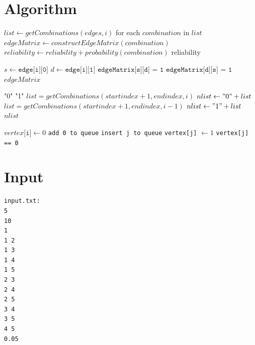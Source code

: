 \documentclass[11pt]{article}
\begin{document}
 \section{Algorithm}
\begin{algorithm}
\label{euclid}
\begin{algorithmic}[1]
\State $list \gets getCombinations(edges, i)$
\State for each $combination$ in $list$
\State $edgeMatrix \gets constructEdgeMatrix(combination)$
\State $reliability \gets reliability + probability(combination)$
\EndIf
\EndFor
\Return reliability
\EndProcedure
\end{algorithmic}
\begin{algorithmic}[1]
\State $s \gets \texttt{edge[i][0]}$
\State $d \gets \texttt{edge[i][1]}$
\State $\texttt{edgeMatrix[s][d] = 1}$
\State $\texttt{edgeMatrix[d][s] = 1}$
\EndIf
\EndFor
\Return $edgeMatrix$
\EndProcedure
\end{algorithmic}
\begin{algorithmic}[1]
\Return "0"
\EndIf
\Return "1"
\EndIf
\State $list = getCombinations(startindex+1, endindex, i)$
\State $nlist \gets "0" + list$
\EndFor
\State $list = getCombinations(startindex+1, endindex, i-1)$
\State $nlist \gets "1" + list$
\EndFor
\Return $nlist$
\EndProcedure
\end{algorithmic}
\begin{algorithmic}[1]
\State $vertex\texttt{[i]} \gets 0$
\EndFor
\State \texttt{add 0 to queue}
\State \texttt{insert j to queue}
\State \texttt{vertex[j]} $\gets 1$
\EndIf
\EndFor
\EndWhile
{}
\If \texttt{vertex[j] == 0}
\EndIf
\EndFor
{}
\EndProcedure
\end{algorithmic}
\end{algorithm} 
 \pagebreak
 \section{Input}
 \begin{lstlisting}
input.txt:
5
10
1
1 2
1 3
1 4
1 5
2 3
2 4
2 5
3 4
3 5
4 5
0.05
\end{lstlisting}
\end{document}
